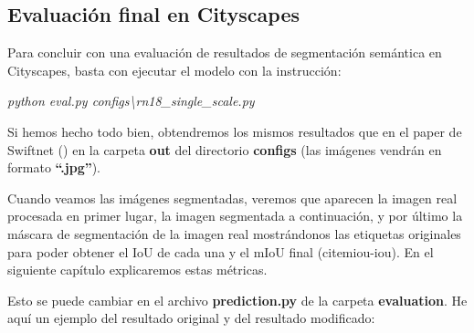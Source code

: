 \subsection{Evaluación final en Cityscapes}

Para concluir con una evaluación de resultados de segmentación semántica en Cityscapes, basta con ejecutar el modelo con la instrucción:

\begin{center}
\textit{python eval.py configs\textbackslash{rn18\_single\_scale.py}}
\end{center}

Si hemos hecho todo bien, obtendremos los mismos resultados que en el paper de Swiftnet (\cite{swiftnet}) en la carpeta \textbf{out} del directorio \textbf{configs} (las imágenes vendrán en formato \textbf{``.jpg''}).

Cuando veamos las imágenes segmentadas, veremos que aparecen la imagen real procesada en primer lugar, la imagen segmentada a continuación, y por último la máscara de segmentación de la imagen real mostrándonos las etiquetas originales para poder obtener el \ac{IoU} de cada una y el \ac{mIoU} final (cite{miou-iou}). En el siguiente capítulo explicaremos estas métricas.

Esto se puede cambiar en el archivo \textbf{prediction.py} de la carpeta \textbf{evaluation}. He aquí un ejemplo del resultado original y del resultado modificado:

